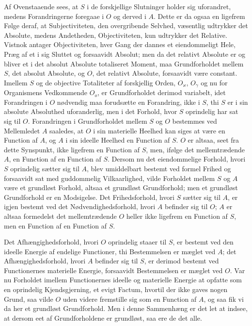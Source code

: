 \documentclass[12pt]{book}
\newcommand{\opage}[1]{\marginnote{\footnotesize\textit{[#1]}}}
\begin{document}
Af Ovenstaaende sees, at $S$ i de forskjellige Slutninger holder sig uforandret, medens Forandringerne
foregaae i $O$ og derved i $A$. Dette er da ogsaa en ligefrem Følge deraf, at Subjectiviteten, den
overgribende Selvhed, væsentlig udtrykker det Absolute, medens Andetheden, Objectiviteten, kun
udtrykker det Relative. Vistnok antager Objectiviteten, hver Gang der dannes et eiendommeligt Hele,
Præg af et i sig Sluttet og forsaavidt Absolut; men da det relativt Absolute er og bliver et i det
absolut Absolute totaliseret Moment, maa Grundforholdet mellem $S$, det absolut Absolute, og $O$, det
relativt Absolute, forsaavidt være constant. Imellem $S$ og de objective Totaliteter af forskjellig
Orden, $O_{\varkappa}$, $O_\gamma$ og nu for Organismens Vedkommende $O_o$, er Grundforholdet derimod
variabelt, idet Forandringen i $O$ nødvendig maa forudsætte en Forandring, ikke i $S$, thi $S$ er i
sin absolute Absoluthed uforanderlig, men i det Forhold, hvor $S$ oprindelig har sat sig til $O$.
Forandringen i Grundforholdet mellem $S$ og $O$ bestemmes ved Mellemledet $A$ saaledes, at $O$ i sin
materielle Heelhed kan siges at være en Function af $A$, og $A$ i sin ideelle Heelhed en Function af
$S$. $O$ er altsaa, seet fra dette Synspunkt, ikke ligefrem en Function af $S$, men, ifølge det
mellemtrædende $A$, en Function af en Function af $S$. Dersom nu det eiendommelige Forhold, hvori $S$
oprindelig sætter sig til $A$, blev umiddelbart bestemt ved formel Frihed og forsaavidt sat med
guddommelig Vilkaarlighed, vilde Forholdet mellem $S$ og $A$ være et grundløst
\opage{442} Forhold, altsaa et grundløst Grundforhold; men et grundløst Grundforhold er en Modsigelse. Det
Frihedsforhold, hvori $S$ sætter sig til $A$, er igjen bestemt ved det Nødvendighedsforhold, hvori $A$
befinder sig til $O$; $A$ er altsaa formedelst det mellemtrædende $O$ heller ikke ligefrem en Function
af $S$, men en Function af en Function af $S$.

Det Afhængighedsforhold, hvori $O$ oprindelig staaer til $S$, er bestemt ved den ideelle Energie af
endelige Functioner, thi Bestemmelsen er mæglet ved $A$; det Afhængighedsforhold, hvori $A$ befinder
sig til $S$, er derimod bestemt ved Functionernes materielle Energie, forsaavidt Bestemmelsen er
mæglet ved $O$. Var nu Forholdet imellem Functionernes ideelle og materielle Energie at opfatte som en
oprindelig Kjendsgjerning, et evigt Factum, hvortil der ikke gaves nogen Grund, saa vilde $O$ uden
videre fremstille sig som en Function af $A$, og saa fik vi da her et grundløst Grundforhold. Men i
denne Sammenhæng er det let at indsee, at dersom eet af Grundforholdene er grundløst, saa ere de det
alle.
\end{document}
